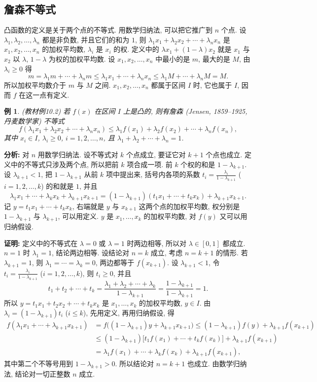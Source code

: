 \documentclass[UTF8,openany]{ctexbook}
\theoremstyle{chinesetextbook}
\newtheorem{example}{例}[section]
\newenvironment{cnproof}{\par\indent\textbf{证明:} \ignorespaces}{\par}
\begin{document}
\subsection{詹森不等式}
凸函数的定义是关于两个点的不等式. 用数学归纳法, 可以把它推广到 $n$ 个点. 设 $\lambda_1,\lambda_2,\ldots,\lambda_n$ 都是非负数, 并且它们的和为 $1$, 则 $\lambda_1x_1+\lambda_2x_2+\cdots+\lambda_nx_n$ 是 $x_1,x_2,\ldots,x_n$ 的加权平均数, $\lambda_i$ 是 $x_i$ 的权. 定义中的 $\lambda x_1+(1-\lambda)x_2$ 就是 $x_1$ 与 $x_2$ 以 $\lambda$, $1-\lambda$ 为权的加权平均数. 设 $x_1,x_2,\ldots,x_n$ 中最小的是 $m$, 最大的是 $M$, 由 $\lambda_i\ge0$ 得
\[
m=\lambda_1m+\cdots+\lambda_nm\le\lambda_1x_1+\cdots+\lambda_nx_n\le\lambda_1M+\cdots+\lambda_nM=M.
\]
所以加权平均数介于 $m$ 与 $M$ 之间. $x_1,x_2,\ldots,x_n$ 都属于区间 $I$ 时, 它也属于 $I$, 因而 $f$ 在这一点有定义.
\begin{example}\label{ex:c2-10-2}
\textnormal{(教材例10.2)} 若 $f(x)$ 在区间 $I$ 上是凸的, 则有詹森 (Jensen, 1859--1925, 丹麦数学家) 不等式
\[
f(\lambda_1x_1+\lambda_2x_2+\cdots+\lambda_nx_n)\le\lambda_1f(x_1)+\lambda_2f(x_2)+\cdots+\lambda_nf(x_n),
\]
其中 $x_i\in I$, $\lambda_i\ge0$, $i=1,2,\ldots,n$, 且 $\lambda_1+\lambda_2+\cdots+\lambda_n=1$.
\end{example}
\par\indent\textbf{分析:} 对 $n$ 用数学归纳法. 设不等式对 $k$ 个点成立, 要证它对 $k+1$ 个点也成立. 定义中的不等式只涉及两个点, 所以把前 $k$ 项合成一项. 前 $k$ 个权的和是 $1-\lambda_{k+1}$. 设 $\lambda_{k+1}<1$, 把 $1-\lambda_{k+1}$ 从前 $k$ 项中提出来, 括号内各项的系数 $\displaystyle t_i=\frac{\lambda_i}{1-\lambda_{k+1}}$ ($i=1,2,\ldots,k$) 的和就是 $1$, 并且
\[
\lambda_1x_1+\cdots+\lambda_kx_k+\lambda_{k+1}x_{k+1}=(1-\lambda_{k+1})(t_1x_1+\cdots+t_kx_k)+\lambda_{k+1}x_{k+1}.
\]
记 $y=t_1x_1+\cdots+t_kx_k$, 右端就是 $y$ 与 $x_{k+1}$ 这两个点的加权平均数, 权分别是 $1-\lambda_{k+1}$ 与 $\lambda_{k+1}$, 可以用定义. $y$ 是 $x_1,\ldots,x_k$ 的加权平均数, 对 $f(y)$ 又可以用归纳假设.
\begin{cnproof}
定义中的不等式在 $\lambda=0$ 或 $\lambda=1$ 时两边相等, 所以对 $\lambda\in[0,1]$ 都成立. $n=1$ 时 $\lambda_1=1$, 结论两边相等. 设结论对 $n=k$ 成立, 考虑 $n=k+1$ 的情形. 若 $\lambda_{k+1}=1$, 则 $\lambda_1=\cdots=\lambda_k=0$, 两边都等于 $f(x_{k+1})$. 设 $\lambda_{k+1}<1$, 令 $\displaystyle t_i=\frac{\lambda_i}{1-\lambda_{k+1}}$ ($i=1,2,\ldots,k$), 则 $t_i\ge0$, 并且
\[
t_1+t_2+\cdots+t_k=\frac{\lambda_1+\lambda_2+\cdots+\lambda_k}{1-\lambda_{k+1}}=\frac{1-\lambda_{k+1}}{1-\lambda_{k+1}}=1.
\]
所以 $y=t_1x_1+t_2x_2+\cdots+t_kx_k$ 是 $x_1,\ldots,x_k$ 的加权平均数, $y\in I$. 由 $\lambda_i=(1-\lambda_{k+1})t_i$ ($i\le k$), 先用定义, 再用归纳假设, 得
\[
\begin{aligned}
f(\lambda_1x_1+\cdots+\lambda_{k+1}x_{k+1})&=f\bigl((1-\lambda_{k+1})y+\lambda_{k+1}x_{k+1}\bigr)\le(1-\lambda_{k+1})f(y)+\lambda_{k+1}f(x_{k+1})\\
&\le(1-\lambda_{k+1})\bigl[t_1f(x_1)+\cdots+t_kf(x_k)\bigr]+\lambda_{k+1}f(x_{k+1})\\
&=\lambda_1f(x_1)+\cdots+\lambda_kf(x_k)+\lambda_{k+1}f(x_{k+1}),
\end{aligned}
\]
其中第二个不等号用到 $1-\lambda_{k+1}>0$. 所以结论对 $n=k+1$ 也成立. 由数学归纳法, 结论对一切正整数 $n$ 成立.
\end{cnproof}
\end{document}

